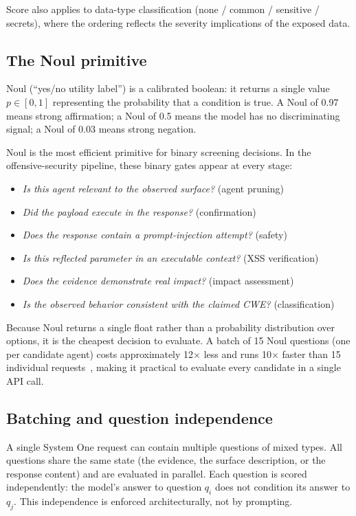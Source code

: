 \documentclass[conference]{IEEEtran}
\begin{document}
Score also applies to data-type classification (none / common / sensitive / secrets), where the ordering reflects the severity implications of the exposed data.

\subsection{The Noul primitive}

Noul (``yes/no utility label'') is a calibrated boolean: it returns a single value $p \in [0,1]$ representing the probability that a condition is true. A Noul of 0.97 means strong affirmation; a Noul of 0.5 means the model has no discriminating signal; a Noul of 0.03 means strong negation.

Noul is the most efficient primitive for binary screening decisions. In the offensive-security pipeline, these binary gates appear at every stage:

\begin{itemize}[leftmargin=*]
\item \emph{Is this agent relevant to the observed surface?} (agent pruning)
\item \emph{Did the payload execute in the response?} (confirmation)
\item \emph{Does the response contain a prompt-injection attempt?} (safety)
\item \emph{Is this reflected parameter in an executable context?} (XSS verification)
\item \emph{Does the evidence demonstrate real impact?} (impact assessment)
\item \emph{Is the observed behavior consistent with the claimed CWE?} (classification)
\end{itemize}

Because Noul returns a single float rather than a probability distribution over options, it is the cheapest decision to evaluate. A batch of 15 Noul questions (one per candidate agent) costs approximately 12$\times$ less and runs 10$\times$ faster than 15 individual requests~\cite{typesafe2026docs}, making it practical to evaluate every candidate in a single API call.

\subsection{Batching and question independence}

A single System One request can contain multiple questions of mixed types. All questions share the same state (the evidence, the surface description, or the response content) and are evaluated in parallel. Each question is scored independently: the model's answer to question $q_i$ does not condition its answer to $q_j$. This independence is enforced architecturally, not by prompting.
\end{document}
